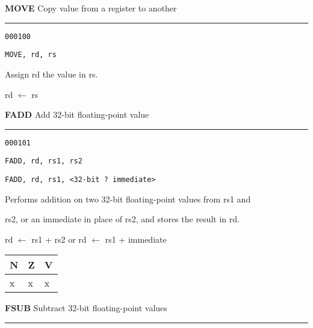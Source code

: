 \documentclass{article}
\begin{document}
\bigskip\bigskip

\flushleft
\LARGE\textbf{MOVE} \large \hfill Copy value from a register to another

\kern-3pt
\noindent\rule{16.5cm}{0.4pt}
\normalsize

{\large
	 \texttt{000100} \par
	\smallbreak
	 \texttt{MOVE, rd, rs} \par
	\smallbreak
	 Assign rd the value in rs. \par
	\smallbreak
	 rd $\leftarrow$ rs \par
}

\pagebreak

\flushleft
\LARGE\textbf{FADD} \large \hfill Add 32-bit floating-point value

\kern-3pt
\noindent\rule{16.5cm}{0.4pt}
\normalsize

{\large
	 \texttt{000101} \par
	\smallbreak
	 \texttt{FADD, rd, rs1, rs2} \par
	\smallbreak
	 \texttt{FADD, rd, rs1, <32-bit ? immediate>} \par
	\smallbreak
	 Performs addition on two 32-bit floating-point values from rs1 and \par
	\makebox[3.5cm][l]{  } rs2, or an immediate in place of rs2, and stores the result in rd. \par
	\smallbreak
	 rd $\leftarrow$ rs1 + rs2 \quad or \quad rd $\leftarrow$ rs1 + immediate\par
	\smallbreak
	 \begin{tabular}{lll} N \quad & Z \quad & V \\ \hline x & x & x \\ \end{tabular}
}

\bigskip\bigskip

\flushleft
\LARGE\textbf{FSUB} \large \hfill Subtract 32-bit floating-point values

\kern-3pt
\noindent\rule{16.5cm}{0.4pt}
\normalsize
\end{document}
